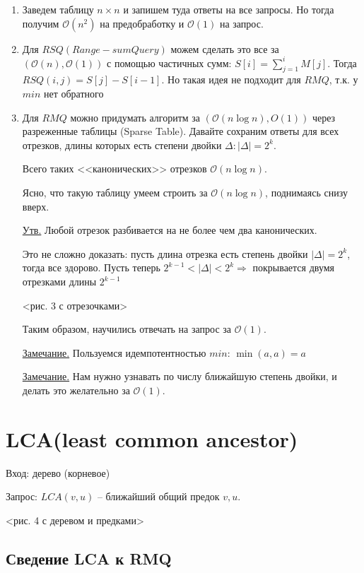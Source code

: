\documentclass[fleqn, 12pt]{article}
\newcommand{\bigo}{\mathcal{O}}
\begin{document}
\begin{enumerate}
	\item Заведем таблицу $ n \times n $ и запишем туда ответы на все запросы. Но тогда получим $ \bigo(n^2) $ на предобработку и $ \bigo(1) $ на запрос.
	
	\item Для $ RSQ(Range-sum Query) $ можем сделать это все за $ (\bigo(n), \bigo(1)) $ с помощью частичных сумм: $ S[i] = \sum \limits_{j = 1}^i M[j] $. Тогда $ RSQ(i, j) = S[j] - S[i - 1] $. Но такая идея не подходит для $ RMQ $, т.к. у $ min $ нет обратного
	
	\item Для $ RMQ $ можно придумать алгоритм за $ (\bigo(n \log n), O(1)) $ через разреженные таблицы (Sparse Table). Давайте сохраним ответы для всех отрезков, длины которых есть степени двойки $ \Delta \colon |\Delta| = 2^k$. 
	
	Всего таких <<канонических>> отрезков $ \bigo(n \log n) $.
	
	Ясно, что такую таблицу умеем строить за $ \bigo(n \log n) $, поднимаясь снизу вверх.
	
	\underline{Утв.} Любой отрезок разбивается на не более чем два канонических.
	
	Это не сложно доказать: пусть длина отрезка есть степень двойки $ |\Delta| = 2^k $, тогда все здорово. Пусть теперь $ 2^{k - 1} < |\Delta| < 2^k \Rightarrow $ покрывается двумя отрезками длины $ 2^{k - 1} $
	
	<рис. 3 с отрезочками>
	
	Таким образом, научились отвечать на запрос за $ \bigo(1) $.
	
	\underline{Замечание.} Пользуемся идемпотентностью $ min $: $ \min(a, a) = a $
	
	\underline{Замечание.} Нам нужно узнавать по числу ближайшую степень двойки, и делать это желательно за $ \bigo(1) $.
\end{enumerate}


\section{LCA(least common ancestor)}

Вход: дерево (корневое)

Запрос: $ LCA(v, u) $ -- ближайший общий предок $ v, u $.

<рис. 4 с деревом и предками>


\subsection{Сведение LCA к RMQ}
\end{document}
